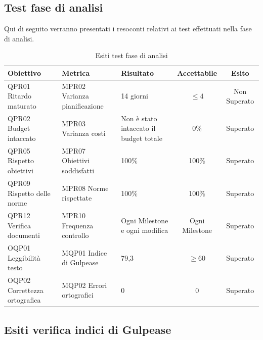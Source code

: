 \documentclass[../piano_di_qualifica.tex]{subfiles}
\begin{document}
\subsection{Test fase di analisi}
Qui di seguito verranno presentati i resoconti relativi ai test effettuati nella fase di analisi. \par

\begin{table}[!ht]
	\centering
	\begin{tabular}{|p{3cm}|p{3.3cm}|l|c|c|}
		\hline
		\rowcolor{lightgray}
		\textbf{Obiettivo}  & \textbf{Metrica} & \textbf{Risultato} & \textbf{Accettabile} & \textbf{Esito} \\
		\hline
		QPR01 Ritardo maturato & MPR02 Varianza pianificazione  & 14 giorni  & \(\leq 4\) & Non Superato  \\
		\hline
		QPR02 Budget intaccato   & MPR03 Varianza costi   &  Non è stato intaccato il budget totale    &  0\%  &  Superato\\
		\hline
		QPR05 Rispetto obiettivi   & MPR07 Obiettivi soddisfatti     & 100\%   & 100\% & Superato  \\
		\hline
		QPR09 Rispetto delle norme  & MPR08 Norme rispettate   & 100\%  & 100\%   & Superato\\
		\hline
		QPR12 Verifica documenti   & MPR10 Frequenza controllo    & Ogni Milestone e ogni modifica   & Ogni Milestone    & Superato \\
		\hline
		OQP01 Leggibilità testo & MQP01 Indice di Gulpease  & 79,3  & \(\ge 60\)  & Superato \\
		\hline
		OQP02 Correttezza ortografica   & MQP02 Errori ortografici   &     0    &  0 & Superato  \\
		\hline
	\end{tabular}
	\caption{Esiti test fase di analisi}
\end{table}


\subsection{Esiti verifica indici di Gulpease}
\label{sub:verif_gul}
\end{document}
